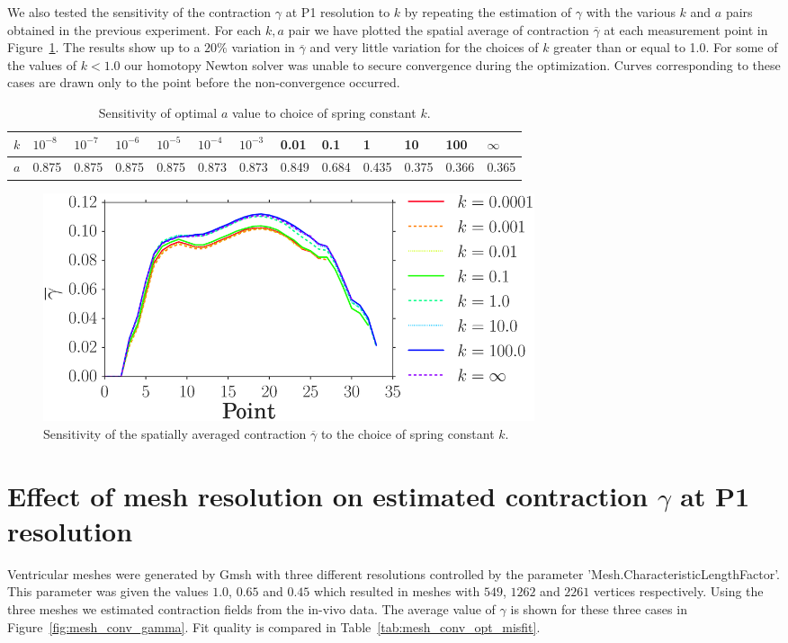 We also tested the sensitivity of the contraction $\gamma$ at P1 resolution to $k$ by
repeating the estimation of $\gamma$ with the various $k$ and $a$ pairs obtained in the
previous experiment. For each $k, a$ pair we have plotted the spatial average of contraction $\overline{\gamma}$
at each measurement point in Figure~\ref{fig:gamma_sense}. The results
show up to a $20 \%$ variation in $\overline{\gamma}$ and
very little variation for the choices of $k$ greater than or equal to
1.0. For some of the values of $k < 1.0$ our homotopy Newton solver was unable to 
secure convergence during the optimization. Curves corresponding to
these cases are drawn only to the point before the non-convergence occurred.


\begin{table}
\caption{Sensitivity of optimal $a$ value to choice of spring constant $k$.}
\begin{tabular}{|l|llllllllllll|}
\hline
      $k$ & $10^{-8}$ & $10^{-7}$& $10^{-6}$&  $10^{-5}$  & $10^{-4}$ & $10^{-3}$ & 0.01 & 0.1 & 1 & 10 & 100 & $\infty$ \\
\hline
      $a$ & 0.875   & 0.875  & 0.875  & 0.875 & 0.873& 0.873 & 0.849 & 0.684 & 0.435 & 0.375& 0.366 & 0.365 \\
\hline
\end{tabular}
\label{tab:elast_sense}
\end{table}

\begin{figure}[t]
\includegraphics[width=0.7\textwidth]{gamma_mean}
\caption{Sensitivity of the spatially averaged 
contraction $\overline{\gamma}$ to the choice of spring constant $k$.}
\label{fig:gamma_sense}
\end{figure}


\section{Effect of mesh resolution on estimated contraction $\gamma$ at P1 resolution}
\label{sec:mesh_res}
Ventricular meshes were generated by Gmsh
\cite{geuzaine2009gmsh} with three different resolutions controlled by the parameter
'Mesh.CharacteristicLengthFactor'.  This parameter
was given the values $1.0$, $0.65$ and $0.45$ which resulted in meshes with
$549$, $1262$ and $2261$ vertices respectively. Using the three meshes
we estimated contraction fields from the in-vivo data. The average value of
$\gamma$ is shown for these three cases in Figure~\ref{fig:mesh_conv_gamma}. 
Fit quality is compared in Table~\ref{tab:mesh_conv_opt_misfit}.

